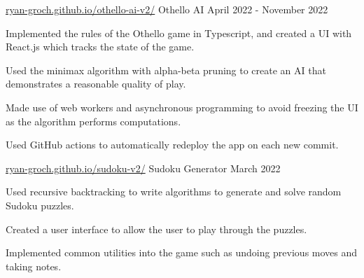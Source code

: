 \begin{cventries}


  \cventry
    {\href{https://ryan-groch.github.io/othello-ai-v2/}{ryan-groch.github.io/othello-ai-v2/}} %
    {Othello AI} %
    {April 2022 - November 2022} %
    {} %
    {
      \begin{cvitems} %
        \item {Implemented the rules of the Othello game in Typescript, and created a UI with React.js which tracks the state of the game.}
        \item {Used the minimax algorithm with alpha-beta pruning to create an AI that demonstrates a reasonable quality of play.}
        \item {Made use of web workers and asynchronous programming to avoid freezing the UI as the algorithm performs computations.}
        \item {Used GitHub actions to automatically redeploy the app on each new commit.}
      \end{cvitems}
    }

  \cventry
    {\href{https://ryan-groch.github.io/sudoku-v2/}{ryan-groch.github.io/sudoku-v2/}} %
    {Sudoku Generator} %
    {March 2022} %
    {} %
    {
      \begin{cvitems} %
        \item {Used recursive backtracking to write algorithms to generate and solve random Sudoku puzzles.}
        \item {Created a user interface to allow the user to play through the puzzles.}
        \item {Implemented common utilities into the game such as undoing previous moves and taking notes.}
      \end{cvitems}
    }


\end{cventries}
